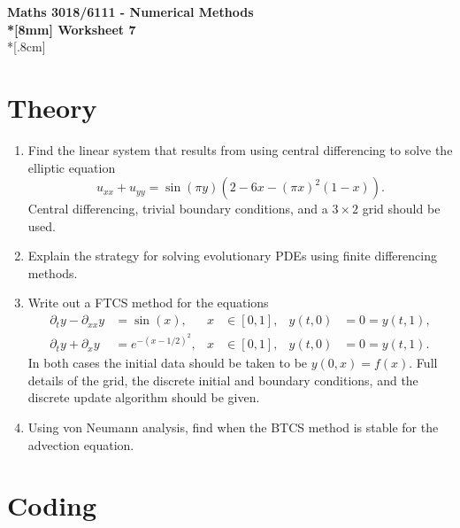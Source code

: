 \documentclass[10pt]{article}
\begin{document}
\thispagestyle{empty}
\begin{center}
\textbf{\Large Maths 3018/6111 - Numerical Methods \\*[8mm]
Worksheet 7}\\*[.8cm]
\end{center}

\section*{Theory}

\begin{enumerate}
\item Find the linear system that results from using central
  differencing to solve the elliptic equation
  \begin{equation*}
    u_{xx} + u_{yy} = \sin ( \pi y ) \left( 2 - 6 x - (\pi x)^2 (1 -
      x) \right).
  \end{equation*}
  Central differencing, trivial boundary conditions, and a $3 \times
  2$ grid should be used.
\item Explain the strategy for solving evolutionary PDEs using finite
  differencing methods.
\item Write out a FTCS method for the equations
  \begin{align*}
    \partial_t y - \partial_{xx} y & = \sin(x), & x & \in [0,1], &
    y(t, 0) & = 0 = y(t, 1), \\
    \partial_t y + \partial_{x} y & = e^{-(x-1/2)^2}, & x & \in [0,1], &
    y(t, 0) & = 0 = y(t, 1).
  \end{align*}
  In both cases the initial data should be taken to be $y(0, x) =
  f(x)$. Full details of the grid, the discrete initial and boundary
  conditions, and the discrete update algorithm should be given.
\item Using von Neumann analysis, find when the BTCS method is stable
  for the advection equation.
\end{enumerate}

\section*{Coding}
\end{document}
